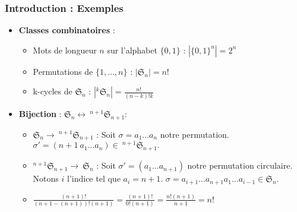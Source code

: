 \documentclass{beamer}
\begin{document}
\begin{frame} %
    \frametitle{Introduction : Exemples}
    \begin{itemize}
        \item \textbf{Classes combinatoires} :
        \begin{itemize}
            \item Mots de longueur $n$ sur l'alphabet $\{0,1\}$ :
                $|\{0,1\}^n| = 2^n$
            \item Permutations de $\{1, \ldots, n\}$ :
                $|\mathfrak{S}_n| = n!$
            \item k-cycles de $\mathfrak{S}_n$ :
                $\displaystyle|^k\mathfrak{S}_n| = \frac{n!}{(n-k)!k}$
        \end{itemize}
        \item \textbf{Bijection} : $\mathfrak{S}_n \longleftrightarrow
            \ ^{n+1}\mathfrak{S}_{n+1}$:
            \begin{itemize}
                \item $\mathfrak{S}_n \to\ ^{n+1}\mathfrak{S}_{n+1}$ :
                Soit $\sigma = a_1 \ldots a_n$ notre permutation.
                    $\sigma' = (n+1 \ a_1 \ldots a_n) \in \ 
                    ^{n+1}\mathfrak{S}_{n+1}.$
                \item $^{n+1}\mathfrak{S}_{n+1} \to\ \mathfrak{S}_n$ :
                    Soit $\sigma' = (a_1 \ldots a_{n+1})$ notre permutation
                    circulaire. Notons $i$ l'indice tel que $a_i = n + 1$.
                    $\sigma = a_{i+1} \ldots a_{n+1} a_1 \ldots a_{i-1} \in 
                    \mathfrak{S}_n.$
                \item $\displaystyle \frac{(n+1)!}{(n+1 - (n+1))!(n+1)} =
                    \frac{(n+1)!}{0!(n+1)} = \frac{n!(n+1)}{n+1} = n!$
            \end{itemize}
    \end{itemize}
\end{frame}
\end{document}
